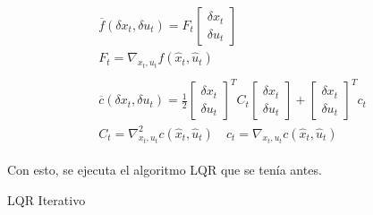 \begin{align}
\left. \begin{array}{l}{ \overline { f } ( \delta x _ { t } , \delta u _ { t } ) = F _ { t }
    \left[ \begin{array} { c } { \delta x _ { t } } \\ { \delta u _ { t } } \end{array} \right]
    }\\{F_t = \nabla _ { x _ { t } , u _ { t } } f ( \hat { x } _ { t } , \hat { u } _ { t } )
    }\end{array} \right.\\
\left. \begin{array}{l}{ \overline { c } ( \delta x _ { t } , \delta u _ { t } ) = \frac { 1 } {
    2 } \left[ \begin{array} { c } { \delta x _ { t } } \\ { \delta u _ { t } } \end{array}
    \right] ^ { T } C _ { t } \left[ \begin{array} { c } { \delta x _ { t } } \\ { \delta u _ { t
    } } \end{array} \right] + \left[ \begin{array} { l } { \delta x _ { t } } \\ { \delta u _ { t
    } } \end{array} \right] ^ { T } c _ { t } }\\{ C_t=\nabla _ { x _ { t } , u _ { t } } ^ { 2 }
    c ( \hat { x } _ { t } , \hat { u } _ { t } )\quad c_t= \nabla _ { x _ { t } , u _ { t } } c ( \hat { x } _ { t } , \hat { u } _ { t } ) }\end{array} \right.
\end{align}

Con esto, se ejecuta el algoritmo LQR que se tenía antes. 

\begin{algorithm}
    \caption{LQR Iterativo}
\end{algorithm}

